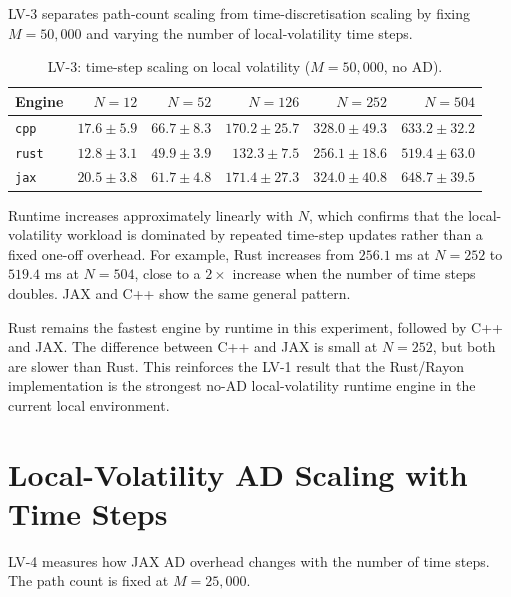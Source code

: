 LV-3 separates path-count scaling from time-discretisation scaling by fixing
\(M=50{,}000\) and varying the number of local-volatility time steps.

\begin{table}[htbp]
\centering
\small
\caption{LV-3: time-step scaling on local volatility (\(M=50{,}000\), no AD).}
\label{tab:lv3-n-scaling}
\begin{tabular}{lrrrrr}
\toprule
\textbf{Engine}
& \textbf{\(N=12\)}
& \textbf{\(N=52\)}
& \textbf{\(N=126\)}
& \textbf{\(N=252\)}
& \textbf{\(N=504\)} \\
\midrule
\texttt{cpp}
& \(17.6\pm 5.9\)
& \(66.7\pm 8.3\)
& \(170.2\pm25.7\)
& \(328.0\pm49.3\)
& \(633.2\pm32.2\) \\
\texttt{rust}
& \(12.8\pm 3.1\)
& \(49.9\pm 3.9\)
& \(132.3\pm 7.5\)
& \(256.1\pm18.6\)
& \(519.4\pm63.0\) \\
\texttt{jax}
& \(20.5\pm 3.8\)
& \(61.7\pm 4.8\)
& \(171.4\pm27.3\)
& \(324.0\pm40.8\)
& \(648.7\pm39.5\) \\
\bottomrule
\end{tabular}
\end{table}

Runtime increases approximately linearly with \(N\), which confirms that the
local-volatility workload is dominated by repeated time-step updates rather
than a fixed one-off overhead.  For example, Rust increases from \(256.1\) ms
at \(N=252\) to \(519.4\) ms at \(N=504\), close to a \(2\times\) increase
when the number of time steps doubles.  JAX and C++ show the same general
pattern.

Rust remains the fastest engine by runtime in this experiment, followed by C++ and JAX.
The difference between C++ and JAX is small at \(N=252\), but both are slower
than Rust.  This reinforces the LV-1 result that the Rust/Rayon
implementation is the strongest no-AD local-volatility runtime engine in the
current local environment.

\section{Local-Volatility AD Scaling with Time Steps}
\label{sec:results-lv4}

LV-4 measures how JAX AD overhead changes with the number of time steps.  The
path count is fixed at \(M=25{,}000\).

